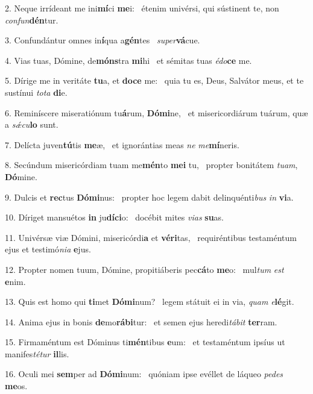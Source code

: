2. Neque irrídeant me ini\textbf{mí}ci \textbf{me}i: \ast\  étenim univérsi, qui sústinent te, non \textit{con}\textit{fun}\textbf{dén}tur.\

3. Confundántur omnes in\textbf{í}qua a\textbf{gén}tes \ast\  \textit{su}\textit{per}\textbf{vá}cue.\

4. Vias tuas, Dómine, de\textbf{móns}tra \textbf{mi}hi \ast\  et sémitas tuas \textit{é}\textit{do}\textbf{ce} me.\

5. Dírige me in veritáte \textbf{tu}a, et \textbf{do}\textbf{ce} me: \ast\  quia tu es, Deus, Salvátor meus, et te sustínui \textit{to}\textit{ta} \textbf{di}e.\

6. Reminíscere miseratiónum tu\textbf{á}rum, \textbf{Dó}\textbf{mi}ne, \ast\  et misericordiárum tuárum, quæ a \textit{sǽ}\textit{cu}\textbf{lo} sunt.\

7. Delícta juven\textbf{tú}tis \textbf{me}æ, \ast\  et ignorántias meas \textit{ne} \textit{me}\textbf{mí}neris.\

8. Secúndum misericórdiam tuam me\textbf{mén}to \textbf{me}\textbf{i} tu, \ast\  propter bonitátem \textit{tu}\textit{am}, \textbf{Dó}mine.\

9. Dulcis et \textbf{rec}tus \textbf{Dó}\textbf{mi}nus: \ast\  propter hoc legem dabit delinquénti\textit{bus} \textit{in} \textbf{vi}a.\

10. Díriget mansuétos \textbf{in} ju\textbf{dí}\textbf{ci}o: \ast\  docébit mites \textit{vi}\textit{as} \textbf{su}as.\

11. Univérsæ viæ Dómini, misericórdi\textbf{a} et \textbf{vé}\textbf{ri}tas, \ast\  requiréntibus testaméntum ejus et testimó\textit{ni}\textit{a} \textbf{e}jus.\

12. Propter nomen tuum, Dómine, propitiáberis pec\textbf{cá}to \textbf{me}o: \ast\  mul\textit{tum} \textit{est} \textbf{e}nim.\

13. Quis est homo qui \textbf{ti}met \textbf{Dó}\textbf{mi}num? \ast\  legem státuit ei in via, \textit{quam} \textit{e}\textbf{lé}git.\

14. Anima ejus in bonis \textbf{de}mo\textbf{rá}\textbf{bi}tur: \ast\  et semen ejus heredi\textit{tá}\textit{bit} \textbf{ter}ram.\

15. Firmaméntum est Dóminus ti\textbf{mén}tibus \textbf{e}um: \ast\  et testaméntum ipsíus ut manifes\textit{té}\textit{tur} \textbf{il}lis.\

16. Oculi mei \textbf{sem}per ad \textbf{Dó}\textbf{mi}num: \ast\  quóniam ipse evéllet de láqueo \textit{pe}\textit{des} \textbf{me}os.\

